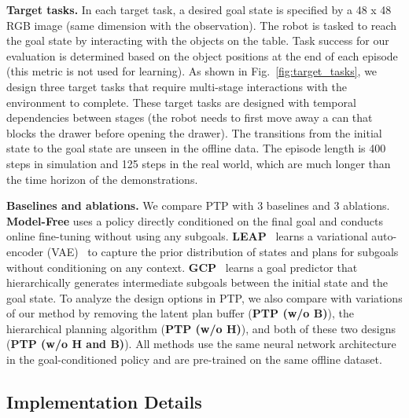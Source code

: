 \textbf{Target tasks.} 
In each target task, a desired goal state is specified by a 48 x 48 RGB image (same dimension with the observation). The robot is tasked to reach the goal state by interacting with the objects on the table. Task success for our evaluation is determined based on the object positions at the end of each episode (this metric is not used for learning). As shown in Fig.~\ref{fig:target_tasks}, we design three target tasks that require multi-stage interactions with the environment to complete. These target tasks are designed with temporal dependencies between stages (\eg the robot needs to first move away a can that blocks the drawer before opening the drawer). The transitions from the initial state to the goal state are unseen in the offline data. The episode length is 400 steps in simulation and 125 steps in the real world, which are much longer than the time horizon of the demonstrations. 

\textbf{Baselines and ablations.} 
We compare PTP with 3 baselines and 3 ablations. \textbf{Model-Free} uses a policy directly conditioned on the final goal and conducts online fine-tuning without using any subgoals. \textbf{LEAP}~\cite{Nasiriany2019PlanningWG} learns a variational auto-encoder (VAE)~\cite{kingma2014vae} to capture the prior distribution of states and plans for subgoals without conditioning on any context. \textbf{GCP}~\cite{Pertsch2020LongHorizonVP} learns a goal predictor that hierarchically generates intermediate subgoals between the initial state and the goal state. To analyze the design options in PTP, we also compare with variations of our method by removing the latent plan buffer (\textbf{PTP (w/o B)}), the hierarchical planning algorithm (\textbf{PTP (w/o H)}), and both of these two designs (\textbf{PTP (w/o H and B)}). All methods use the same neural network architecture in the goal-conditioned policy and are pre-trained on the same offline dataset.

\subsection{Implementation Details}
\label{sec:implementation_details}




